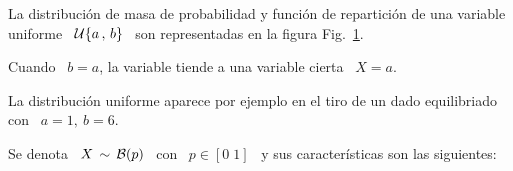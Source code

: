 La distribuci\'on  de masa de probabilidad  y funci\'on de  repartici\'on de una
variable uniforme  \ $\mathcal{U}\{  a \, ,  \, b  \}$ \ son  representadas en  la figura
Fig.~\ref{Fig:MP:UniformeDiscreta}.
%
\begin{figure}[h!]
\begin{center}  \end{center}
% 
\label{Fig:MP:UniformeDiscreta}
\end{figure}

Cuando \ $b = a$, la variable tiende a una variable cierta \ $X = a$.

La  distribuci\'on  uniforme  aparece  por   ejemplo  en  el  tiro  de  un  dado
equilibriado con \ $a = 1, \: b = 6$.



\label{Sssec:MP:Bernoulli}

Se  denota \  $X \,  \sim \,  \mathcal{B}(p)$ \  con \  $p \in  [0 \;  1]$ \  y sus
caracter\'isticas son las siguientes:


